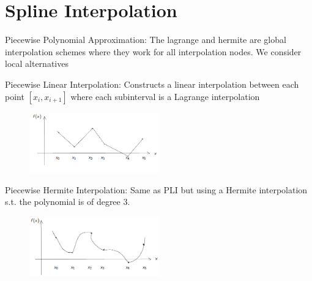 \section{Spline Interpolation}
\begin{definition}
    Piecewise Polynomial Approximation:  The lagrange and hermite are global interpolation schemes where 
    they work for all interpolation nodes. We consider local alternatives
\end{definition}
\begin{definition}
    Piecewise Linear Interpolation: Constructs a linear interpolation between each point
    \(\left[ x_i, x_{i+1}  \right] \) where each subinterval is a Lagrange interpolation
    \begin{figure}[H]
        \centering
        \includegraphics[width=0.5\textwidth]{Figures/03.png}
        \caption{}
        \label{fig:}
    \end{figure}
\end{definition}
\begin{definition}
    Piecewise Hermite Interpolation: Same as PLI but using a Hermite interpolation s.t. the polynomial is of 
    degree 3.
    \begin{figure}[H]
        \centering
        \includegraphics[width=0.5\textwidth]{Figures/04.png}
        \caption{}
        \label{fig:}
    \end{figure}
\end{definition}

